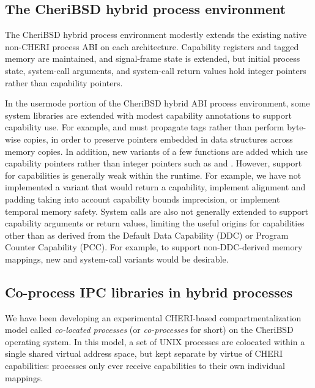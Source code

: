 \documentclass[12pt,twoside,openright,a4paper]{article}
\newcommand{\ccode}[1]{{\small\ttfamily{#1}}}
\newcommand{\note}[2]{{\color{blue}[ Note: #1 - #2]}}
\renewcommand{\note}[2]{\relax\ifhmode\unskip\fi}
\newcommand{\rwnote}[1]{\note{#1}{Robert W.}}
\newcommand{\psnote}[1]{\note{#1}{Peter S.}}
\newcommand{\jhbnote}[1]{\note{#1}{John B.}}
\begin{document}
\subsection{The CheriBSD hybrid process environment}

The CheriBSD hybrid process environment modestly extends the existing native
non-CHERI process ABI on each architecture.
Capability registers and tagged memory are maintained, and signal-frame state
is extended, but initial process state, system-call arguments, and system-call
return values hold integer pointers rather than capability pointers.

In the usermode portion of the CheriBSD hybrid ABI process environment, some
system libraries are extended with modest capability annotations to support
capability use.
For example, \ccode{memcpy()} and \ccode{sort()} must propagate tags rather
than perform byte-wise copies, in order to preserve pointers embedded in data
structures across memory copies.
In addition, new variants of a few functions are added which use
capability pointers rather than integer pointers such as
\ccode{memcpy\_c()} and \ccode{memset\_c()}.
\psnote{Apart from that??}
\psnote{[limited/weak] ?}
However, support for capabilities is generally weak within the runtime.
For example, we have not implemented a \ccode{malloc\_c()} variant that would
return a capability, implement alignment and padding taking into account
capability bounds imprecision, or implement temporal memory safety.
\psnote{hard to parse the latter parts of the preceding sentence}
\rwnote{Possibly now improved?}
\jhbnote{I think it is confusing to mention \ccode{malloc\_c()} this
  early as the idea of \ccode{*\_c()} variants isn't yet explained.  I
  have tried to rectify this a bit.}
System calls are also not generally extended to support capability arguments
or return values, limiting the useful origins for capabilities other than as
derived from the Default Data Capability (DDC) or Program Counter Capability
(PCC).
For example, to support non-DDC-derived memory mappings, new \ccode{mmap\_c}
and \ccode{munmap\_c} system-call variants would be desirable.

\subsection{Co-process IPC libraries in hybrid processes}

We have been developing an experimental CHERI-based compartmentalization model
called \textit{co-located processes} (or \textit{co-processes} for short) on
the CheriBSD operating system.
In this model, a set of UNIX processes are colocated within a single shared
virtual address space, but kept separate by virtue of CHERI capabilities:
processes only ever receive capabilities to their own individual mappings.
\end{document}
